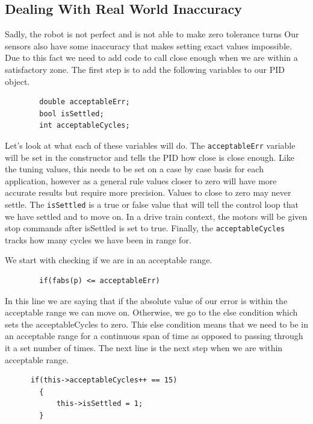 \documentclass[12pt]{report}
\begin{document}
\subsection{Dealing With Real World Inaccuracy}
    Sadly, the robot is not perfect and is not able to make zero tolerance turns
    Our sensors also have some inaccuracy that makes setting exact values impossible.
    Due to this fact we need to add code to call close enough when we are within a satisfactory zone.
    The first step is to add the following variables to our PID object.

    \begin{verbatim}
        double acceptableErr;
        bool isSettled;
        int acceptableCycles;
    \end{verbatim}

    Let's look at what each of these variables will do.
    The \verb|acceptableErr| variable will be set in the constructor and tells the PID how close is close enough.
    Like the tuning values, this needs to be set on a case by case basis for each application, 
        however as a general rule values closer to zero will have more accurate results but require more precision.
    Values to close to zero may never settle. The \verb|isSettled| is a true or false value that will tell the control loop that we have settled and to move on.
    In a drive train context, the motors will be given stop commands after isSettled is set to true.
    Finally, the \verb|acceptableCycles| tracks how many cycles we have been in range for.

    We start with checking if we are in an acceptable range.

    \begin{verbatim}
        if(fabs(p) <= acceptableErr)
    \end{verbatim}

    In this line we are saying that if the absolute value of our error is within the acceptable range we can move on.
    Otherwise, we go to the else condition which sets the acceptableCycles to zero.
    This else condition means that we need to be in an acceptable range for a continuous span of time as opposed to passing through it a set number of times.
    The next line is the next step when we are within acceptable range.

    \begin{verbatim}
      if(this->acceptableCycles++ == 15)
        {
            this->isSettled = 1;
        }
    \end{verbatim}
\end{document}
